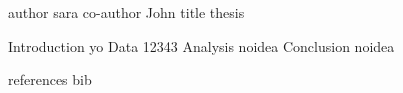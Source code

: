author  sara
co-author John
title  thesis

Introduction  yo
Data  12343
Analysis  noidea
Conclusion noidea

references  bib 

